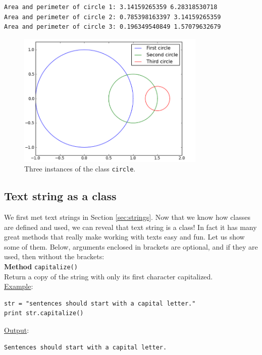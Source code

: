 \begin{verbatim}
Area and perimeter of circle 1: 3.14159265359 6.28318530718
Area and perimeter of circle 2: 0.785398163397 3.14159265359
Area and perimeter of circle 3: 0.196349540849 1.57079632679
\end{verbatim}

\begin{figure}[!ht]
\begin{center}
\includegraphics[width=0.8\textwidth]{imgp/3circ.png}
\end{center}
\vspace{-2mm}
\caption{Three instances of the class {\tt circle}.}
\label{fig:3circ}
\end{figure}

\subsection{Text string as a class} \label{subsec:textstrclass}

We first met text strings in Section \ref{sec:strings}. Now that 
we know how classes are defined and used, we can reveal that 
text string is a class! In fact it has many great methods that 
really make working with texts easy and fun. Let us show some 
of them. Below, arguments enclosed in brackets are optional,
and if they are used, then without the brackets:\\

\noindent
{\bf Method} {\tt capitalize()}\\

\noindent
Return a copy of the string with only its first character capitalized.\\

\noindent
\underline{Example}:
\begin{verbatim}
str = "sentences should start with a capital letter."
print str.capitalize()
\end{verbatim}
\underline{Output}:
\begin{verbatim}
Sentences should start with a capital letter.
\end{verbatim}
\vspace{4mm}

